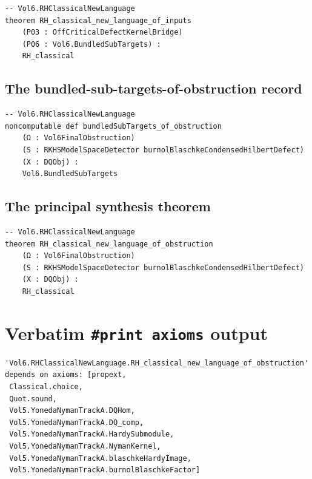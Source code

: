 \documentclass[11pt]{article}
\theoremstyle{plain}
\theoremstyle{definition}
\theoremstyle{remark}
\begin{document}
\begin{lstlisting}
-- Vol6.RHClassicalNewLanguage
theorem RH_classical_new_language_of_inputs
    (P03 : OffCriticalDefectKernelBridge)
    (P06 : Vol6.BundledSubTargets) :
    RH_classical
\end{lstlisting}

\subsection{The bundled-sub-targets-of-obstruction record}

\begin{lstlisting}
-- Vol6.RHClassicalNewLanguage
noncomputable def bundledSubTargets_of_obstruction
    (Ω : Vol6FinalObstruction)
    (S : RKHSModelSpaceDetector burnolBlaschkeCondensedHilbertDefect)
    (X : DQObj) :
    Vol6.BundledSubTargets
\end{lstlisting}

\subsection{The principal synthesis theorem}

\begin{lstlisting}
-- Vol6.RHClassicalNewLanguage
theorem RH_classical_new_language_of_obstruction
    (Ω : Vol6FinalObstruction)
    (S : RKHSModelSpaceDetector burnolBlaschkeCondensedHilbertDefect)
    (X : DQObj) :
    RH_classical
\end{lstlisting}

\section{Verbatim \texttt{\#print axioms} output}
\label{appx:print-axioms}

\begin{lstlisting}
'Vol6.RHClassicalNewLanguage.RH_classical_new_language_of_obstruction'
depends on axioms: [propext,
 Classical.choice,
 Quot.sound,
 Vol5.YonedaNymanTrackA.DQHom,
 Vol5.YonedaNymanTrackA.DQ_comp,
 Vol5.YonedaNymanTrackA.HardySubmodule,
 Vol5.YonedaNymanTrackA.NymanKernel,
 Vol5.YonedaNymanTrackA.blaschkeHardyImage,
 Vol5.YonedaNymanTrackA.burnolBlaschkeFactor]
\end{lstlisting}
\end{document}
